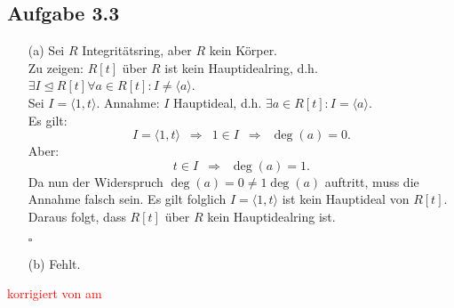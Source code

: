 \documentclass[12pt]{article}
\newcommand{\corr}[1]{\textcolor{red}{#1}}
\newcommand{\QED}{\begin{flushright} $\square$ \end{flushright}}
\newcommand{\df}{\enspace\Longrightarrow\enspace}
\newcommand{\isIdeal}{\trianglelefteq}
\newcommand{\ideal}[1]{\langle#1\rangle}
\begin{document}
\subsection*{Aufgabe 3.3}
\begin{enumerate}
	\item[(a)] Sei $R$ Integritätsring, aber $R$ kein Körper. \\
		Zu zeigen: $R[t]$ über $R$ ist kein Hauptidealring, d.h. $\exists I\isIdeal R[t]\forall a\in R[t]: I\neq\ideal{a}$.  \\
		Sei $I=\ideal{1,t}$. Annahme: $I$ Hauptideal, d.h. $\exists a\in R[t]: I=\ideal{a}$. \\
		Es gilt: $$I=\ideal{1,t}\df 1\in I\df\deg(a)=0.$$
		Aber:
		$$t\in I\df\deg(a)=1.$$
		Da nun der Widerspruch $\deg(a)=0\neq 1\deg(a)$ auftritt, muss die Annahme falsch sein. Es gilt folglich $I=\ideal{1,t}$ ist kein Hauptideal von $R[t]$. \\
		Daraus folgt, dass $R[t]$ über $R$ kein Hauptidealring ist.
		\QED
		
		\item[(b)] Fehlt.
\end{enumerate}



\bigskip

\corr{korrigiert von \hspace{1cm} am }
\end{document}
